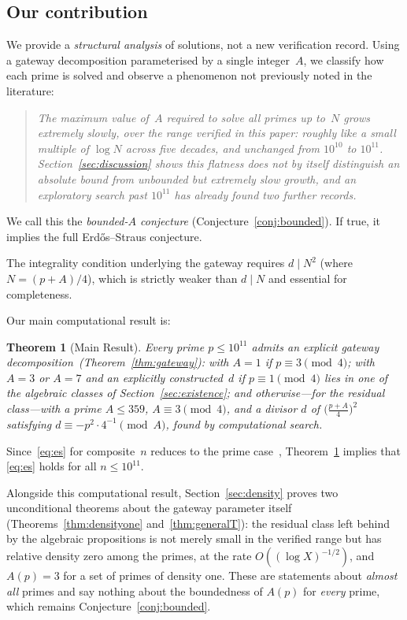 \documentclass[12pt]{amsart}
\newtheorem{theorem}{Theorem}[section]
\theoremstyle{definition}
\theoremstyle{remark}
\begin{document}
\subsection*{Our contribution}
We provide a \emph{structural analysis} of solutions,
not a new verification record.
Using a gateway decomposition parameterised by a single integer~$A$,
we classify how each prime is solved and observe a phenomenon not
previously noted in the literature:

\begin{quote}
\itshape The maximum value of~$A$ required to solve all primes up to~$N$
grows extremely slowly, over the range verified in this paper: roughly
like a small multiple of $\log N$ across five decades, and unchanged
from $10^{10}$ to $10^{11}$. Section~\ref{sec:discussion} shows this
flatness does not by itself distinguish an absolute bound from
unbounded but extremely slow growth, and an exploratory search past
$10^{11}$ has already found two further records.
\end{quote}

We call this the \emph{bounded-$A$ conjecture} (Conjecture~\ref{conj:bounded}).
If true, it implies the full Erd\H{o}s--Straus conjecture.

The integrality condition underlying the gateway requires $d \mid N^2$
(where $N = (p+A)/4$), which is strictly weaker than $d \mid N$ and
essential for completeness.

Our main computational result is:

\begin{theorem}[Main Result]\label{thm:main}
Every prime $p \leq 10^{11}$ admits an explicit gateway
decomposition~\textup{(Theorem~\ref{thm:gateway})}:
with $A = 1$ if $p \equiv 3 \pmod 4$;
with $A = 3$ or $A = 7$ and an explicitly constructed~$d$ if
$p \equiv 1 \pmod 4$ lies in one of the algebraic classes of
Section~\ref{sec:existence};
and otherwise---for the residual class---with a prime
$A \leq 359$, $A \equiv 3 \pmod{4}$, and a divisor
$d$ of $\bigl(\frac{p+A}{4}\bigr)^{\!2}$ satisfying
$d \equiv -p^2 \cdot 4^{-1} \pmod{A}$, found by computational search.
\end{theorem}

Since~\eqref{eq:es} for composite~$n$ reduces to the prime
case~\cite{Mordell1967}, Theorem~\ref{thm:main} implies that
\eqref{eq:es} holds for all $n \leq 10^{11}$.

Alongside this computational result, Section~\ref{sec:density} proves
two unconditional theorems about the gateway parameter itself
(Theorems~\ref{thm:densityone} and~\ref{thm:generalT}): the residual
class left behind by the algebraic propositions is not merely small in
the verified range but has relative density zero among the primes, at
the rate $O((\log X)^{-1/2})$, and $A(p) = 3$ for a set of primes of
density one.  These are statements about \emph{almost all} primes and
say nothing about the boundedness of $A(p)$ for \emph{every} prime,
which remains Conjecture~\ref{conj:bounded}.
\end{document}
